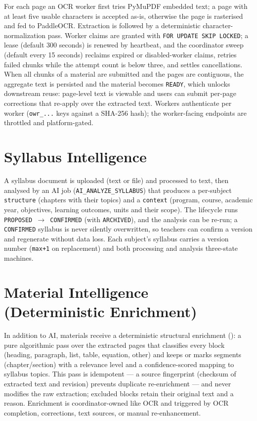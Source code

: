For each page an OCR worker first tries PyMuPDF embedded text; a page with at
least five usable characters is accepted as-is, otherwise the page is
rasterised and fed to PaddleOCR. Extraction is followed by a deterministic
character-normalization pass. Worker claims are granted with
\texttt{FOR UPDATE SKIP LOCKED}; a lease (default 300 seconds) is renewed by
heartbeat, and the coordinator sweep (default every 15 seconds) reclaims
expired or disabled-worker claims, retries failed chunks while the attempt
count is below three, and settles cancellations. When all chunks of a
material are submitted and the pages are contiguous, the aggregate text is
persisted and the material becomes \texttt{READY}, which unlocks downstream
reuse: page-level text is viewable and users can submit per-page corrections
that re-apply over the extracted text. Workers authenticate per worker
(\texttt{owr\_...} keys against a SHA-256 hash); the worker-facing endpoints
are throttled and platform-gated.

\section{Syllabus Intelligence}

A syllabus document is uploaded (text or file) and processed to text, then
analysed by an AI job (\texttt{AI\_ANALYZE\_SYLLABUS}) that produces a
per-subject \texttt{structure} (chapters with their topics) and a
\texttt{context} (program, course, academic year, objectives, learning
outcomes, units and their scope). The lifecycle runs
\texttt{PROPOSED $\rightarrow$ CONFIRMED} (with \texttt{ARCHIVED}), and the
analysis can be re-run; a \texttt{CONFIRMED} syllabus is never silently
overwritten, so teachers can confirm a version and regenerate without data
loss. Each subject's syllabus carries a version number (\texttt{max+1} on
replacement) and both processing and analysis three-state machines.

\section{Material Intelligence (Deterministic Enrichment)}

In addition to AI, materials receive a deterministic structural enrichment
(\texttt{}): a pure algorithmic pass over the extracted
pages that classifies every block (heading, paragraph, list, table, equation,
other) and keeps or marks segments (chapter/section) with a relevance level and
a confidence-scored mapping to syllabus topics. This pass is idempotent --- a
source fingerprint (checksum of extracted text and revision) prevents
duplicate re-enrichment --- and never modifies the raw extraction; excluded
blocks retain their original text and a reason. Enrichment is coordinator-owned
like OCR and triggered by OCR completion, corrections, text sources, or manual
re-enhancement.

